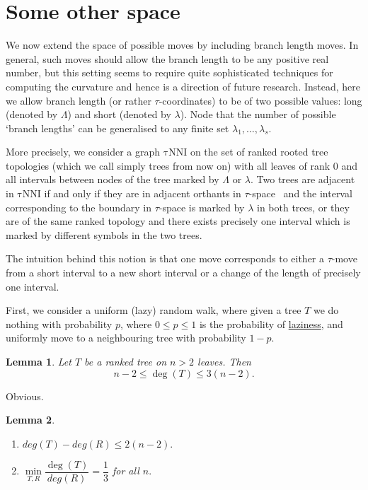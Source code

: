 \documentclass{amsart}
\newtheorem{lemma}{Lemma}
\newcommand{\tN}{\mathrm{\tau NNI}}
\begin{document}
\section{Some other space}

We now extend the space of possible moves by including branch length moves. 
In general, such moves should allow the branch length to be any positive real 
number, but this setting seems to require quite sophisticated techniques for 
computing the curvature and hence is a direction of future research. 
Instead, here we allow branch length (or rather $\tau$-coordinates) 
to be of two possible values: long (denoted by $\Lambda$) and short (denoted 
by $\lambda$). Node that the number of possible `branch lengths' can be 
generalised to any finite set $\lambda_1,\ldots,\lambda_s$.

More precisely, we consider a graph $\tN$ on the set of ranked rooted tree 
topologies (which we call simply trees from now on) with all leaves of rank 
$0$ and all intervals between nodes of the tree marked by $\Lambda$ or
$\lambda$. Two trees are adjacent in $\tN$ if and only if they are in 
adjacent orthants in $\tau$-space~\cite{Gavryushkin2014-bw} and the interval corresponding 
to the boundary in $\tau$-space is marked by $\lambda$ in both trees, 
or they are of the same ranked topology and there 
exists precisely one interval which is marked by different symbols in 
the two trees. 

The intuition behind this notion is that one move corresponds to either 
a $\tau$-move from a short interval to a new short interval or a change 
of the length of precisely one interval. 

First, we consider a uniform (lazy) random walk, where given a tree $T$ 
we do nothing with probability $p$, where $0\leq p\leq 1$ is the probability of 
\href{https://academichelp.net/wp-content/uploads/2014/01/laziness.jpg}{laziness},
and uniformly move to a neighbouring tree with probability $1-p$. 

\begin{lemma}
Let $T$ be a ranked tree on $n>2$ leaves. Then \[n-2\leq \deg(T)\leq3(n-2).\] 
\end{lemma}

\proof
Obvious.
\endproof

\begin{lemma}
\begin{enumerate}[(1)]
\item $deg(T)-deg(R) \leq 2(n-2).$
\item $\min\limits_{T,R}\dfrac{\deg(T)}{deg(R)} = \dfrac13$ for all $n.$
\end{enumerate}
\end{lemma}
\end{document}
